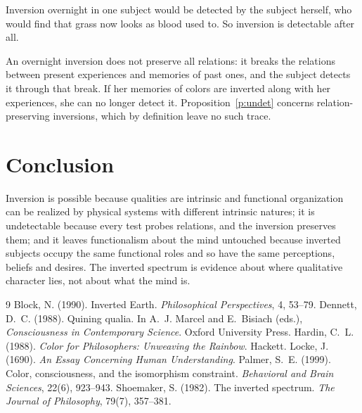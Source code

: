 \documentclass{situationist-preprint}
\begin{document}
\begin{objection}
Inversion overnight in one subject would be detected by the subject herself, who would find that grass now looks as blood used to. So inversion is detectable after all.
\end{objection}

\begin{reply}
An overnight inversion does not preserve all relations: it breaks the relations between present experiences and memories of past ones, and the subject detects it through that break. If her memories of colors are inverted along with her experiences, she can no longer detect it. Proposition~\ref{p:undet} concerns relation-preserving inversions, which by definition leave no such trace.
\end{reply}

\section{Conclusion}

Inversion is possible because qualities are intrinsic and functional organization can be realized by physical systems with different intrinsic natures; it is undetectable because every test probes relations, and the inversion preserves them; and it leaves functionalism about the mind untouched because inverted subjects occupy the same functional roles and so have the same perceptions, beliefs and desires. The inverted spectrum is evidence about where qualitative character lies, not about what the mind is.

\begin{thebibliography}{9}\small
{} Block, N. (1990). Inverted Earth. \emph{Philosophical Perspectives}, 4, 53--79.
 Dennett, D.~C. (1988). Quining qualia. In A.~J. Marcel and E.~Bisiach (eds.), \emph{Consciousness in Contemporary Science}. Oxford University Press.
 Hardin, C.~L. (1988). \emph{Color for Philosophers: Unweaving the Rainbow}. Hackett.
 Locke, J. (1690). \emph{An Essay Concerning Human Understanding}.
 Palmer, S.~E. (1999). Color, consciousness, and the isomorphism constraint. \emph{Behavioral and Brain Sciences}, 22(6), 923--943.
 Shoemaker, S. (1982). The inverted spectrum. \emph{The Journal of Philosophy}, 79(7), 357--381.
\end{thebibliography}
\end{document}
